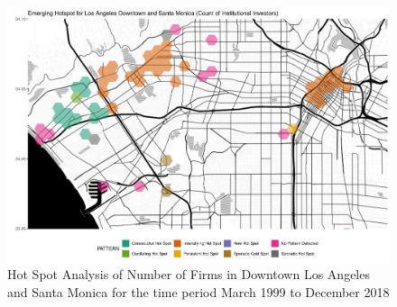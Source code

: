 \begin{figure}
	\centering
	\includegraphics[width=1\linewidth]{Figures/ChapterIV/LA_Count_EH_Downtown}
	\caption[Hot Spot Analysis of Number of Firms in Downtown Los Angeles and Santa Monica 1999-2018]{Hot Spot Analysis of Number of Firms in Downtown Los Angeles and Santa Monica for the time period March 1999 to December 2018}
	\label{fig:LAcounthotspot_Downtown}
\end{figure}


